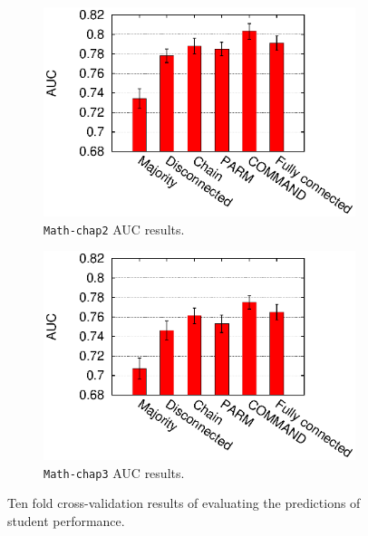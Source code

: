 \documentclass{edm_template}
\newcommand{\hl}[1]{\colorbox{yellow}{#1}}
\begin{document}
	\begin{figure}[!ht]
		\centering
		\begin{subfigure}[b]{0.48\linewidth}
			\centering
			\includegraphics[width=1.1\linewidth]{figures/hed_chap2_30_auc.eps}
			\caption{\texttt{Math-chap2} AUC results. }
			\label{fig:auc-chap2}
		\end{subfigure}
		\begin{subfigure}[b]{0.48\linewidth}
			\centering
			\includegraphics[width=1.1\linewidth]{figures/hed_chap3_33_auc.eps}
			\caption{\texttt{Math-chap3} AUC results.}
			\label{fig:auc-chap3}
		\end{subfigure}%
		\caption{Ten fold cross-validation results of evaluating the predictions of student performance.} %
		\label{fig:aucs}
	\end{figure} 	
	
\end{document}

